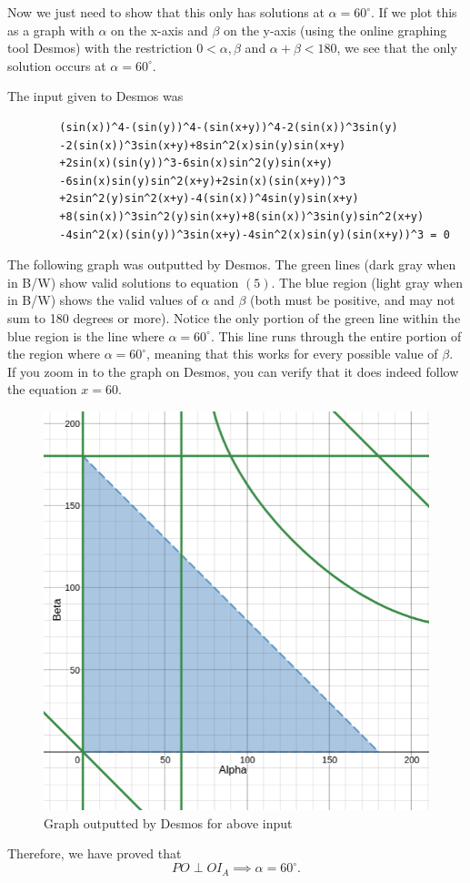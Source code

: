 \documentclass[12pt]{article}
\begin{document}
\begin{solution}{5}
    Now we just need to show that this only has solutions at $\alpha=60^\circ$.
    If we plot this as a graph with $\alpha$ on the x-axis and $\beta$ on the y-axis
    (using the online graphing tool Desmos) with the restriction $0<\alpha,\beta$ and
    $\alpha+\beta<180$, we see that the only solution occurs at $\alpha=60^\circ$.
    
    \newpage
    The input given to Desmos was
    \begin{verbatim}
        (sin(x))^4-(sin(y))^4-(sin(x+y))^4-2(sin(x))^3sin(y)
        -2(sin(x))^3sin(x+y)+8sin^2(x)sin(y)sin(x+y)
        +2sin(x)(sin(y))^3-6sin(x)sin^2(y)sin(x+y)
        -6sin(x)sin(y)sin^2(x+y)+2sin(x)(sin(x+y))^3
        +2sin^2(y)sin^2(x+y)-4(sin(x))^4sin(y)sin(x+y)
        +8(sin(x))^3sin^2(y)sin(x+y)+8(sin(x))^3sin(y)sin^2(x+y)
        -4sin^2(x)(sin(y))^3sin(x+y)-4sin^2(x)sin(y)(sin(x+y))^3 = 0
    \end{verbatim}
    
    The following graph was outputted by Desmos. The green lines (dark gray when in B/W) show valid solutions
    to equation $(5)$. The blue region (light gray when in B/W) shows the valid values of $\alpha$ and $\beta$ (both must
    be positive, and may not sum to 180 degrees or more). Notice the only portion of the green line within the
    blue region is the line where $\alpha=60^\circ$. This line runs through the entire portion of the region where
    $\alpha=60^\circ$, meaning that this works for every possible value of $\beta$. If you zoom in to the graph
    on Desmos, you can verify that it does indeed follow the equation $x=60$.
    
    \begin{figure}[H]
        \centering
        \includegraphics[width=5in]{media/R2P5Solutions.png}
        \caption{Graph outputted by Desmos for above input}
    \end{figure}
    
    Therefore, we have proved that
    \begin{equation*}
        PO\perp OI_A \implies \alpha=60^\circ. \tag*{\qed}
    \end{equation*}
    
\end{solution}
\end{document}
